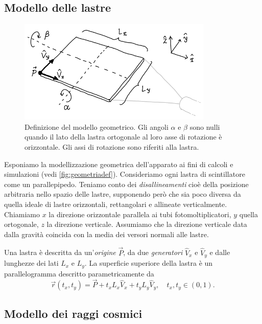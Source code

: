 \subsection{Modello delle lastre}
\label{sec:teogeom}

\begin{figure}
	\center
	\includegraphics[width=25em]{geometriadef}
	\caption{\label{fig:geometriadef}
	Definizione del modello geometrico.
	Gli angoli $\alpha$ e $\beta$ sono nulli
	quando il lato della lastra ortogonale al loro asse di rotazione è orizzontale.
	Gli assi di rotazione sono riferiti alla lastra.}
\end{figure}

Esponiamo la modellizzazione geometrica dell'apparato ai fini di calcoli e simulazioni
(vedi \autoref{fig:geometriadef}).
Consideriamo ogni lastra di scintillatore come un parallepipedo.
Teniamo conto dei \emph{disallineamenti} cioè della posizione arbitraria nello spazio delle lastre,
supponendo però che sia poco diversa da quella ideale di lastre orizzontali, rettangolari e allineate verticalmente.
Chiamiamo $x$ la direzione orizzontale parallela ai tubi fotomoltiplicatori,
$y$ quella ortogonale,
$z$ la direzione verticale.
Assumiamo che la direzione verticale data dalla gravità
coincida con la media dei versori normali alle lastre.

Una lastra è descritta da un'\emph{origine} $\vec P$,
da due \emph{generatori} $\hat V_x$ e $\hat V_y$
e dalle lunghezze dei lati $L_x$ e $L_y$.
La superficie superiore della lastra è un parallelogramma descritto parametricamente da
\begin{equation}
	\label{eq:lastra}
	\vec r(t_x, t_y) = \vec P + t_x L_x \hat V_x + t_y L_y \hat V_y,
	\quad t_x,t_y \in (0,1).
\end{equation}

\subsection{Modello dei raggi cosmici}

